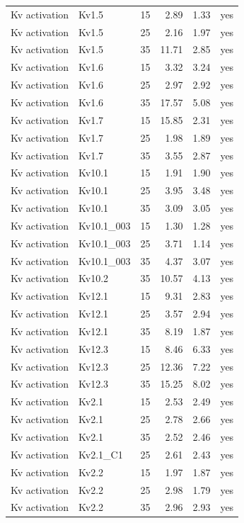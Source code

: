 \begin{longtable}{lllrrl}
Kv activation & Kv1.5 & 15 & 2.89 & 1.33 & yes \\
Kv activation & Kv1.5 & 25 & 2.16 & 1.97 & yes \\
Kv activation & Kv1.5 & 35 & 11.71 & 2.85 & yes \\
Kv activation & Kv1.6 & 15 & 3.32 & 3.24 & yes \\
Kv activation & Kv1.6 & 25 & 2.97 & 2.92 & yes \\
Kv activation & Kv1.6 & 35 & 17.57 & 5.08 & yes \\
Kv activation & Kv1.7 & 15 & 15.85 & 2.31 & yes \\
Kv activation & Kv1.7 & 25 & 1.98 & 1.89 & yes \\
Kv activation & Kv1.7 & 35 & 3.55 & 2.87 & yes \\
Kv activation & Kv10.1 & 15 & 1.91 & 1.90 & yes \\
Kv activation & Kv10.1 & 25 & 3.95 & 3.48 & yes \\
Kv activation & Kv10.1 & 35 & 3.09 & 3.05 & yes \\
Kv activation & Kv10.1\_003 & 15 & 1.30 & 1.28 & yes \\
Kv activation & Kv10.1\_003 & 25 & 3.71 & 1.14 & yes \\
Kv activation & Kv10.1\_003 & 35 & 4.37 & 3.07 & yes \\
Kv activation & Kv10.2 & 35 & 10.57 & 4.13 & yes \\
Kv activation & Kv12.1 & 15 & 9.31 & 2.83 & yes \\
Kv activation & Kv12.1 & 25 & 3.57 & 2.94 & yes \\
Kv activation & Kv12.1 & 35 & 8.19 & 1.87 & yes \\
Kv activation & Kv12.3 & 15 & 8.46 & 6.33 & yes \\
Kv activation & Kv12.3 & 25 & 12.36 & 7.22 & yes \\
Kv activation & Kv12.3 & 35 & 15.25 & 8.02 & yes \\
Kv activation & Kv2.1 & 15 & 2.53 & 2.49 & yes \\
Kv activation & Kv2.1 & 25 & 2.78 & 2.66 & yes \\
Kv activation & Kv2.1 & 35 & 2.52 & 2.46 & yes \\
Kv activation & Kv2.1\_C1 & 25 & 2.61 & 2.43 & yes \\
Kv activation & Kv2.2 & 15 & 1.97 & 1.87 & yes \\
Kv activation & Kv2.2 & 25 & 2.98 & 1.79 & yes \\
Kv activation & Kv2.2 & 35 & 2.96 & 2.93 & yes \\

\end{longtable}
